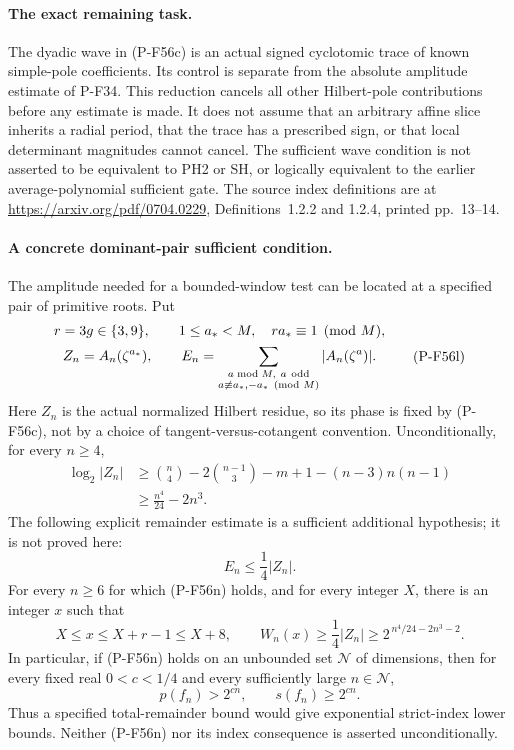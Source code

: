 \documentclass[11pt,a4paper]{article}
\begin{document}
\paragraph{The exact remaining task.}
The dyadic wave in (P-F56c) is an actual signed cyclotomic
trace of known simple-pole coefficients. Its control is
separate from the absolute amplitude estimate of P-F34.
This reduction cancels all other Hilbert-pole contributions
before any estimate is made. It does not assume that an
arbitrary affine slice inherits a radial period, that the
trace has a prescribed sign, or that local determinant
magnitudes cannot cancel. The sufficient wave condition
is not asserted to be equivalent to PH2 or SH, or logically
equivalent to the earlier average-polynomial sufficient gate.
The source index definitions are at
\url{https://arxiv.org/pdf/0704.0229},
Definitions~1.2.2 and 1.2.4, printed pp.~13--14.

\paragraph{A concrete dominant-pair sufficient condition.}
The amplitude needed for a bounded-window test can be located at a
specified pair of primitive roots. Put
\[
 \begin{gathered}
 r=3g\in\{3,9\},\qquad
 1\le a_*<M,\quad ra_*\equiv1\pmod M,\\
 Z_n=A_n(\zeta^{a_*}),\qquad
 E_n=\sum_{\substack{a\bmod M,\ a\ {\rm odd}\\
                         a\not\equiv a_*,-a_*\pmod M}}
                              |A_n(\zeta^a)|.
 \end{gathered}
 \tag{P-F56l}
\]
Here $Z_n$ is the actual normalized Hilbert residue, so its phase
is fixed by (P-F56c), not by a choice of tangent-versus-cotangent
convention. Unconditionally, for every $n\ge4$,
\[
 \begin{split}
 \log_2|Z_n|
 &\ge \binom n4-2\binom{n-1}3-m+1-(n-3)n(n-1)\\
 &\ge \frac{n^4}{24}-2n^3.
 \end{split}
 \tag{P-F56m}
\]
The following explicit remainder estimate is a sufficient
additional hypothesis; it is not proved here:
\[
                         E_n\le\frac14|Z_n|.
 \tag{P-F56n}
\]
For every $n\ge6$ for which (P-F56n) holds, and for every integer
$X$, there is an integer $x$ such that
\[
 X\le x\le X+r-1\le X+8,\qquad
 W_n(x)\ge\frac14|Z_n|
             \ge 2^{\,n^4/24-2n^3-2}.
 \tag{P-F56o}
\]
In particular, if (P-F56n) holds on an unbounded set
$\mathcal N$ of dimensions, then for every fixed real
$0<c<1/4$ and every sufficiently large $n\in\mathcal N$,
\[
                      p(f_n)>2^{cn},
             \qquad  s(f_n)\ge2^{cn}.
 \tag{P-F56p}
\]
Thus a specified total-remainder bound would give exponential
strict-index lower bounds. Neither (P-F56n) nor its index
consequence is asserted unconditionally.
\end{document}
